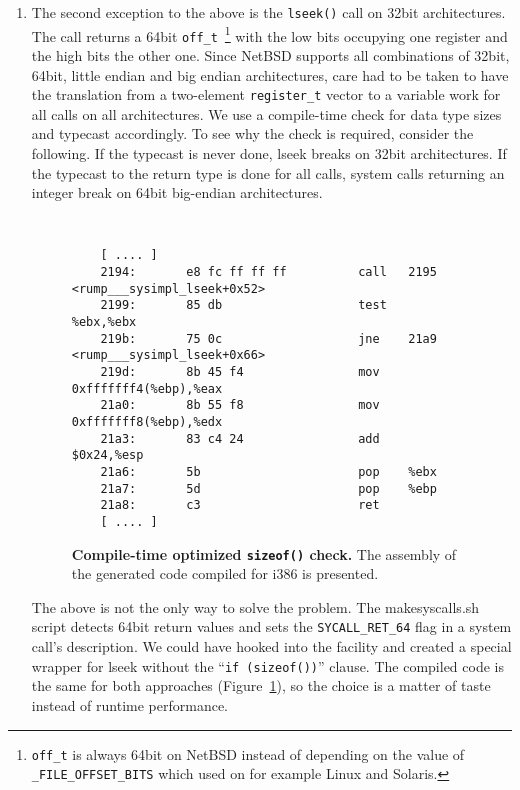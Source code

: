 \begin{enumerate}
\item   The second exception to the above is the \texttt{lseek()}
	call on 32bit architectures.  The call returns a 64bit
	\verb+off_t+~\footnote
	{
		\texttt{off\_t} is always 64bit on NetBSD
		instead of depending on the value of
		\texttt{\_FILE\_OFFSET\_BITS} which used on for
		example Linux and Solaris.
	}
	with the low bits occupying one register and the high
	bits the other one.  Since NetBSD supports all combinations
	of 32bit, 64bit, little endian and big endian architectures,
	care had to be taken to have the translation from a
	two-element \verb+register_t+ vector to a variable work
	for all calls on all architectures.  We use a
	compile-time check for data type sizes and typecast
	accordingly.  To see why the check is required, consider
	the following.  If the typecast is never done, lseek breaks on
	32bit architectures.  If the typecast to the return type is
	done for all calls, system calls returning an integer break on
	64bit big-endian architectures.

\begin{figure}[t]
{\tt \scriptsize  
\begin{verbatim}
    [ .... ]
    2194:       e8 fc ff ff ff          call   2195 <rump___sysimpl_lseek+0x52>
    2199:       85 db                   test   %ebx,%ebx
    219b:       75 0c                   jne    21a9 <rump___sysimpl_lseek+0x66>
    219d:       8b 45 f4                mov    0xfffffff4(%ebp),%eax
    21a0:       8b 55 f8                mov    0xfffffff8(%ebp),%edx
    21a3:       83 c4 24                add    $0x24,%esp
    21a6:       5b                      pop    %ebx
    21a7:       5d                      pop    %ebp
    21a8:       c3                      ret    
    [ .... ]
\end{verbatim}}
\caption[Compile-time optimized \texttt{sizeof()} check]{
\textbf{Compile-time optimized \texttt{sizeof()} check.}
The assembly of the generated code compiled for i386 is presented.
}
\label{fig:lseekasm}
\end{figure}

	The above is not the only way to solve the problem.  The
	makesyscalls.sh script detects 64bit return values and
	sets the \verb+SYCALL_RET_64+ flag in a system call's
	description.  We could have hooked into the facility and created
	a special wrapper for lseek without the ``\texttt{if
	(sizeof())}'' clause.  The compiled code is the same for
	both approaches (Figure~\ref{fig:lseekasm}), so the choice
	is a matter of taste instead of runtime performance.


\end{enumerate}
